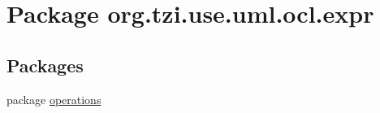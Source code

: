\hypertarget{namespaceorg_1_1tzi_1_1use_1_1uml_1_1ocl_1_1expr}{\section{Package org.\-tzi.\-use.\-uml.\-ocl.\-expr}
\label{namespaceorg_1_1tzi_1_1use_1_1uml_1_1ocl_1_1expr}
}
\subsection*{Packages}
\begin{DoxyCompactItemize}
\item 
package \hyperlink{namespaceorg_1_1tzi_1_1use_1_1uml_1_1ocl_1_1expr_1_1operations}{operations}
\end{DoxyCompactItemize}
